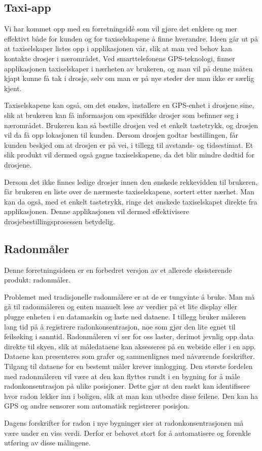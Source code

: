 \subsection{Taxi-app}

Vi har kommet opp med en forretningsidé som vil gjøre det enklere og mer effektivt både for kunden og for taxiselskapene å finne hverandre. Ideen går ut på at taxiselskaper listes opp i applikasjonen vår, slik at man ved behov kan kontakte drosjer i nærområdet. Ved smarttelefonens GPS-teknologi, finner applikasjonen taxiselskaper i nærheten av brukeren, og man vil på denne måten kjapt kunne få tak i drosje, selv om man er på nye steder der man ikke er særlig kjent.

Taxiselskapene kan også, om det ønskes, installere en GPS-enhet i drosjene sine, slik at brukeren kan få informasjon om spesifikke drosjer som befinner seg i nærområdet.
Brukeren kan så bestille drosjen ved et enkelt tastetrykk, og drosjen vil da få opp lokasjonen til kunden.
Dersom drosjen godtar bestillingen, får kunden beskjed om at drosjen er på vei, i tillegg til avstands- og tidsestimat.
Et slik produkt vil dermed også gagne taxiselskapene, da det blir mindre dødtid for drosjene.

Dersom det ikke finnes ledige drosjer innen den ønskede rekkevidden til brukeren, får brukeren en liste over de nærmeste taxiselskapene, sortert etter nærhet. Man kan da også, med et enkelt tastetrykk, ringe det ønskede taxiselskapet direkte fra applikasjonen. Denne applikasjonen vil dermed effektivisere drosjebestillingsprosessen betydelig.


\subsection{Radonmåler}

Denne forretningsideen er en forbedret versjon av et allerede eksisterende produkt: radonmåler.

Problemet med tradisjonelle radonmålere er at de er tungvinte å bruke.
Man må gå til radonmåleren og enten manuelt lese av verdier på et lite display eller plugge enheten i en datamaskin og laste ned dataene.
I tillegg bruker måleren lang tid på å registrere radonkonsentrasjon, noe som gjør den lite egnet til feilsøking i sanntid.
Radonmåleren vi ser for oss laster, derimot jevnlig opp data direkte til skyen, slik at måledataene kan aksesseres på en webside eller i en app.
Dataene kan presenteres som grafer og sammenlignes med nåværende forskrifter.
Tilgang til dataene for en bestemt måler krever innlogging.
Den største fordelen med radonmåleren vil være at den kan flyttes rundt i en bygning for å måle radonkonsentrasjon på ulike posisjoner. Dette gjør at den raskt kan identifisere hvor radon lekker inn i boligen, slik at man kan utbedre disse feilene.
Den kan ha GPS og andre sensorer som automatisk registrerer posisjon.

Dagens forskrifter for radon i nye bygninger sier at radonkonsentrasjonen må være under en viss verdi.
Derfor er behovet stort for å automatisere og forenkle utføring av disse målingene.
